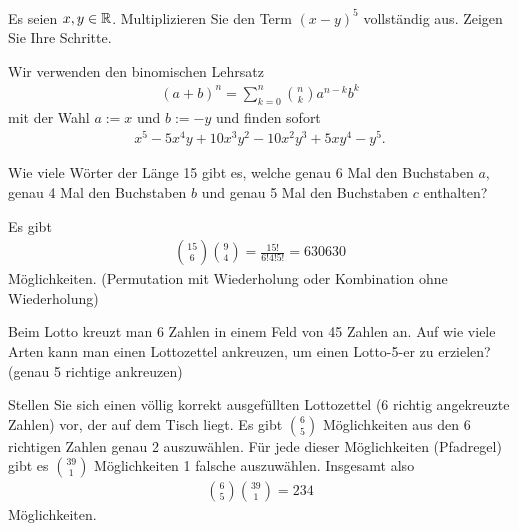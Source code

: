 \begin{questions}
\clearpage
{}
\question[1]
Es seien $x,y\in\mathbb{R}$. Multiplizieren Sie den Term $(x-y)^5$ vollständig aus. Zeigen Sie Ihre Schritte.
\begin{solution}
Wir verwenden den binomischen Lehrsatz
\begin{align*}
    (a+b)^n  = \sum_{k=0}^n \binom{n}{k}a^{n-k}b^k
\end{align*}
mit der Wahl $a:=x$ und $b:=-y$ und finden sofort
\begin{align*}
    x^5 - 5x^4y + 10x^3y^2 - 10x^2y^3 + 5xy^4 - y^5.
\end{align*}
\end{solution}

\question[1]
Wie viele Wörter der Länge 15 gibt es, welche genau 6 Mal den Buchstaben $a$, genau 4 Mal den Buchstaben $b$ und genau 5 Mal den Buchstaben $c$ enthalten?
\begin{solution}
Es gibt
\begin{align*}
    \binom{15}{6}\binom{9}{4} = \frac{15!}{6!4!5!} = 630630
\end{align*}
Möglichkeiten. (Permutation mit Wiederholung oder Kombination ohne Wiederholung)
\end{solution}

\question[1]
Beim Lotto kreuzt man 6 Zahlen in einem Feld von 45 Zahlen an. Auf wie viele Arten kann man einen Lottozettel ankreuzen, um einen Lotto-5-er zu erzielen? (genau 5 richtige ankreuzen)
\begin{solution}
Stellen Sie sich einen völlig korrekt ausgefüllten Lottozettel (6 richtig angekreuzte Zahlen) vor, der auf dem Tisch liegt. Es gibt $\binom{6}{5}$ Möglichkeiten aus den 6 richtigen Zahlen genau 2 auszuwählen. Für jede dieser Möglichkeiten (Pfadregel) gibt es $\binom{39}{1}$ Möglichkeiten 1 falsche auszuwählen. Insgesamt also
\begin{align*}
     \binom{6}{5}\binom{39}{1} = 234
\end{align*}
Möglichkeiten.
\end{solution}


\end{questions}
